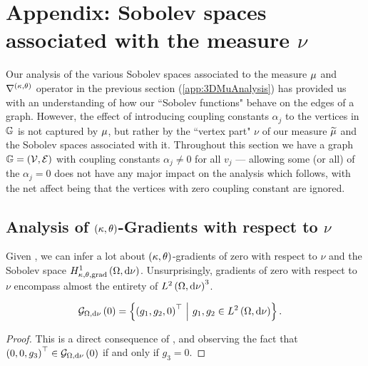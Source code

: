 \section{Appendix: Sobolev spaces associated with the measure $\nu$} \label{app:3DVertexAnalysis}
Our analysis of the various Sobolev spaces associated to the measure $\mu$ and $\nabla^{\left( \kappa, \theta \right)}$ operator in the previous section (\ref{app:3DMuAnalysis}) has provided us with an understanding of how our ``Sobolev functions" behave on the edges of a graph.
However, the effect of introducing coupling constants $\alpha_j$ to the vertices in $\mathbb{G}$ is not captured by $\mu$, but rather by the ``vertex part" $\nu$ of our measure $\widetilde{\mu}$ and the Sobolev spaces associated with it.
Throughout this section we have a graph $\mathbb{G}=\left( \mathcal{V}, \mathcal{E} \right)$ with coupling constants $\alpha_j\neq0$ for all $v_j$ --- allowing some (or all) of the $\alpha_j=0$ does not have any major impact on the analysis which follows, with the net affect being that the vertices with zero coupling constant are ignored.

\subsection{Analysis of $\left( \kappa, \theta \right)$-Gradients with respect to $\nu$} \label{apps:3DVertexGrads}
Given , we can infer a lot about $\left( \kappa, \theta \right)$-gradients of zero with respect to $\nu$ and the Sobolev space $H^1_{\kappa,\theta,\mathrm{grad}}\left( \Omega, \mathrm{d}\nu \right)$.
Unsurprisingly, gradients of zero with respect to $\nu$ encompass almost the entirety of $L^{2}\left( \Omega,\mathrm{d}\nu \right)^3$.
\begin{cory} \label{cory:3DGradZeroVertex}
	\begin{align*}
		\mathcal{G}_{ \Omega, \mathrm{d}\nu}\left( 0 \right) &= \left\{  \left( g_1, g_2, 0 \right)^\top \ \middle\vert \  g_1, g_2\in L^{2}\left( \Omega,\mathrm{d}\nu \right) \right\}.
	\end{align*}
\end{cory}
\begin{proof}
	This is a direct consequence of , and observing the fact that $\left( 0,0,g_3 \right)^\top\in\mathcal{G}_{ \Omega, \mathrm{d}\nu}\left( 0 \right)$ if and only if $g_3=0$.
\end{proof}

